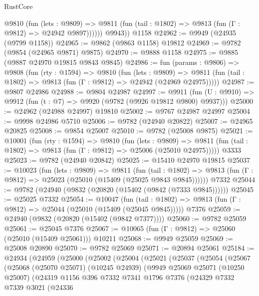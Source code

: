 \begin{lexlean}{RustCore}
\begin{coremodule}
            @9810
              (fun (lets : @9809) =>
              @9811 (fun (tail : @1802) => @9813 (fun (Γ : @9812) => @24942 @9897))))))
        @9943))
    @1158
@24962 := @9949 (@24935 (@9799 @1158))
@24965 := @9862 (@9863 @1158) @19812
@24969 := @9782 (@9854 (@24965 @9871) @9875)
@24970 := @9888 @1158
@24975 := @9885 (@9887 @24970 @19815 @9843 @9845)
@24986 := fun (params : @9806) =>
  @9808
    (fun (rty : @1594) =>
    @9810
      (fun (lets : @9809) =>
      @9811 (fun (tail : @1802) => @9813 (fun (Γ : @9812) => @24942 (@24969 @24975)))))
@24987 := @9807 @24986
@24988 := @9804 @24987
@24997 := @9911
    (fun (U : @9910) => @9912 (fun (t : @7) => @9920 (@9782 (@9926 @19812 @9800) @9937)))
@25000 := @24962 (@24988 @24997) @19810
@25002 := @9767 @24987 @24997
@25004 := @9998 @24986 @5710
@25006 := @9782 (@24940 @20822)
@25007 := @24965 @20825
@25008 := @9854 @25007
@25010 := @9782 (@25008 @9875)
@25021 := @10001
    (fun (rty : @1594) =>
    @9810
      (fun (lets : @9809) =>
      @9811 (fun (tail : @1802) => @9813 (fun (Γ : @9812) => @25006 (@25010 @24975)))))
    @3333
@25023 := @9782 (@24940 @20842)
@25025 := @15410 @24970 @19815
@25037 := @10023
    (fun (lets : @9809) =>
    @9811
      (fun (tail : @1802) =>
      @9813 (fun (Γ : @9812) => @25023 (@25010 (@15409 (@25025 @9843 @9845))))))
    @7332
@25044 := @9782 (@24940 (@9832 (@20820 (@15402 (@9842 (@7333 @9845))))))
@25045 := @25025 @7332
@25054 := @10047
    (fun (tail : @1802) => @9813 (fun (Γ : @9812) => @25044 (@25010 (@15409 (@25045 @9845)))))
    @7376
@25059 := @24940 (@9832 (@20820 (@15402 (@9842 @7377))))
@25060 := @9782 @25059
@25061 := @25045 @7376
@25067 := @10065 (fun (Γ : @9812) => @25060 (@25010 (@15409 @25061))) @10211
@25068 := @9949 @25059
@25069 := @25008 @20890
@25070 := @9782 @25069
@25071 := @20894 @25061
@25184 := @24934
    (@24959
      (@25000
        (@25002
          (@25004
            (@25021
              (@25037
                (@25054
                  (@25067
                    (@25068
                      (@25070 @25071)
                      (@10245 @24939)
                      (@9949
                        @25069
                        @25071
                        (@10250 @25007)
                        (@24319
                          @1156
                          @396
                          @7332
                          @7341
                          @1796
                          @7376
                          (@24329
                            @7332
                            @7339
                            @3021
                            (@24336

\end{coremodule}
\end{lexlean}

